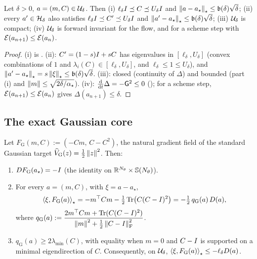 \begin{lemma}
\label{lem:region-geom}
Let $\delta>0$, $a=(m,C)\in\mathcal{U}_\delta$. Then (i) $\ell_\delta I\preceq C\preceq U_\delta I$
and $\left\lVert a-a_\star\right\rVert_\star\leq\mathfrak b(\delta)\sqrt\delta$; (ii) every $a'\in\mathcal{H}_\delta$
also satisfies $\ell_\delta I\preceq C'\preceq U_\delta I$ and
$\left\lVert a'-a_\star\right\rVert_\star\leq\mathfrak b(\delta)\sqrt\delta$; (iii) $\mathcal{U}_\delta$ is compact;
(iv) $\mathcal{U}_\delta$ is forward invariant for the flow, and for a scheme step with
$\mathcal{E}(a_{n+1})\leq\mathcal{E}(a_n)$.
\end{lemma}

\begin{proof}
(i) is . (ii): $C'=(1-s)I+sC$ has eigenvalues in $[\ell_\delta,U_\delta]$
(convex combinations of $1$ and $\lambda_i(C)\in[\ell_\delta,U_\delta]$, and
$\ell_\delta\leq1\leq U_\delta$), and $\left\lVert a'-a_\star\right\rVert_\star=s\left\lVert \xi\right\rVert_\star\leq\mathfrak b(\delta)\sqrt\delta$.
(iii): closed (continuity of $\Delta$) and bounded (part (i) and
$\left\lVert m\right\rVert\leq\sqrt{2\delta/\alpha_\star}$). (iv): $\tfrac{\mathrm{d}}{\mathrm{d} t}\Delta=-\mathsf{G}^2\leq0$
(); for a scheme step, $\mathcal{E}(a_{n+1})\leq\mathcal{E}(a_n)$ gives
$\Delta(a_{n+1})\leq\delta$.
\end{proof}

\subsection{The exact Gaussian core}

\begin{lemma}
\label{lem:gauss-core}
Let $F_{\mathrm G}(m,C):=(-Cm,\,C-C^2)$, the natural gradient field of the standard
Gaussian target $\widehat V_{\mathrm G}(z)=\tfrac12\left\lVert z\right\rVert^2$. Then:
\begin{enumerate}
\item $DF_{\mathrm G}(a_\star)=-I$ (the identity on $\mathbb{R}^{N_\theta}\times\mathbb{S}(N_\theta)$).
\item For every $a=(m,C)$, with $\xi=a-a_\star$,
\[
    \left\langle \xi,F_{\mathrm G}(a)\right\rangle_\star
    =-m^\top Cm-\tfrac12\operatorname{Tr}\bigl(C(C-I)^2\bigr)
    =-\tfrac12\,q_{\mathrm G}(a)\,D(a),
\]
where
$q_{\mathrm G}(a):=\dfrac{2m^\top Cm+\operatorname{Tr}(C(C-I)^2)}{\left\lVert m\right\rVert^2+\tfrac12\left\lVert C-I\right\rVert_{\mathrm{F}}^2}$.
\item $q_{\mathrm G}(a)\geq2\lambda_{\min}(C)$, with equality when $m=0$ and $C-I$ is
supported on a minimal eigendirection of $C$. Consequently, on $\mathcal{U}_\delta$,
$\left\langle \xi,F_{\mathrm G}(a)\right\rangle_\star\leq-\ell_\delta D(a)$.
\end{enumerate}
\end{lemma}

